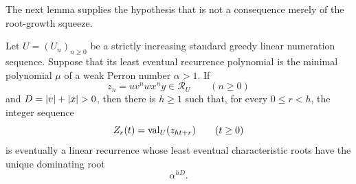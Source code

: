 The next lemma supplies the hypothesis that is not a consequence merely of
the root-growth squeeze.

\begin{lemma}
  \label{lem:paired-loop-dominant-root-transfer}
  Let \(U=(U_n)_{n\ge0}\) be a strictly increasing standard greedy linear
  numeration sequence. Suppose that its least eventual recurrence
  polynomial is the minimal polynomial \(\mu\) of a weak Perron number
  \(\alpha>1\). If
  \[
    z_n=u v^n w x^n y\in\mathcal R_U\qquad(n\ge0)
  \]
  and \(D=\lvert v \rvert+\lvert x \rvert>0\), then there is \(h\ge1\) such that, for every
  \(0\le r<h\), the integer sequence
  \[
    Z_r(t)=\operatorname{val}_U(z_{ht+r})\qquad(t\ge0)
  \]
  is eventually a linear recurrence whose least eventual characteristic
  roots have the unique dominating root
  \[
    \alpha^{hD}.
  \]
\end{lemma}

